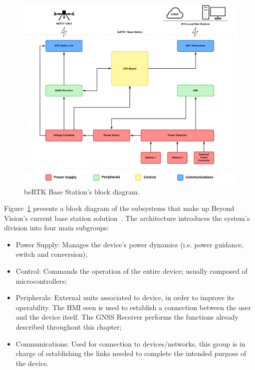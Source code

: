 \begin{figure}[h]
	\centering
	\includegraphics[width=1.0\textwidth]{Chapters/Figures/architecture_original_v2.pdf}
	\caption{beRTK\textsuperscript{\textregistered} Base Station's block diagram.}
	\label{fig:architecture_original}
\end{figure}

Figure~\ref{fig:architecture_original} presents a block diagram of the subsystems that make up Beyond Vision's current base station solution~\cite{beRTK_2022}.
The architecture introduces the system's division into four main subgroups:
\begin{itemize}
    \item Power Supply: Manages the device's power dynamics (i.e. power guidance, switch and conversion);
    \item Control: Commands the operation of the entire device; usually composed of microcontrollers;
    \item Peripherals: External units associated to device, in order to improve its operability. The \gls{HMI} seen is used to establish a connection between the user and the device itself. The GNSS Receiver performs the functions already described throughout this chapter;
    \item Communications: Used for connection to devices/networks, this group is in charge of establishing the links needed to complete the intended purpose of the device.
\end{itemize}

